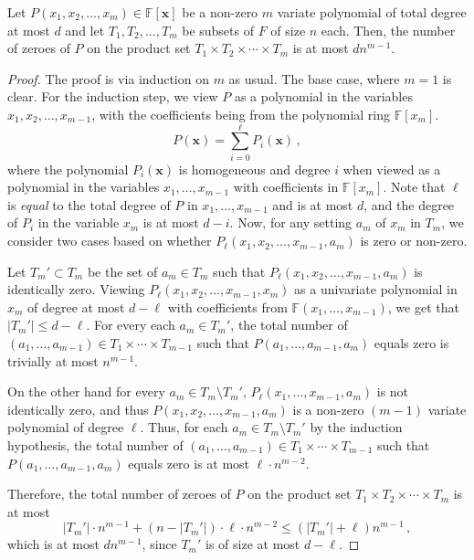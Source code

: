 \documentclass{article}
\def\Field{\mathbb{F}}
\let\F\Field
\def\vecx{\mathbf{x}}
\newcommand{\vx}{\vecx}
\begin{document}
	\begin{lemma}\label{lem: SZ alternate}
		Let $P(x_1, x_2, \ldots, x_m) \in \F[\vx]$ be a non-zero $m$ variate polynomial of total degree at most $d$ and let $T_1, T_2, \ldots, T_m$ be subsets of $F$ of size $n$ each. Then, the number of zeroes of $P$ on the product set $T_1 \times T_2 \times \cdots \times T_m$ is at most $dn^{m-1}$.  
	\end{lemma}
	\begin{proof}
		The proof is via induction on $m$ as usual. The base case, where $m = 1$ is clear. For the induction step, we view $P$ as a polynomial in the variables $x_1, x_2, \ldots, x_{m-1}$, with the coefficients being from the polynomial ring $\F[x_m]$. 
		\[
		P(\vx) = \sum_{i = 0}^{\ell} P_i(\vx) \, , 
		\]
		where the polynomial $P_i(\vx)$ is homogeneous and degree $i$ when viewed as a polynomial in the variables $x_1, \ldots, x_{m-1}$ with coefficients in $\F[x_m]$. Note that $\ell$ is \emph{equal} to the total degree of $P$ in $x_1, \ldots, x_{m-1}$ and is at most $d$, and the degree of $P_i$ in the variable $x_m$ is at most $d-i$. Now, for any setting $a_m$ of $x_m$ in $T_m$,  we consider two cases based on whether $P_{\ell}(x_1, x_2, \ldots, x_{m-1}, a_m)$ is zero or non-zero.  
		
		Let $T_m' \subset T_m$ be the set of $a_m \in T_m$ such that $P_{\ell}(x_1, x_2, \ldots, x_{m-1}, a_m)$ is identically zero. Viewing $P_{\ell}(x_1, x_2, \ldots, x_{m-1}, x_m)$ as a univariate polynomial in $x_m$ of degree at most $d-\ell$ with coefficients from $\F(x_1,\dots,x_{m-1})$, we get that $|T_m'| \leq d-\ell$. For every  each $a_m \in T_m'$, the total number of $(a_1, \ldots, a_{m-1}) \in T_1 \times \cdots \times T_{m-1}$ such that $P(a_1, \ldots, a_{m-1}, a_m)$ equals zero is trivially at most $n^{m-1}$. 
		
		On the other hand for every $a_m \in T_m \setminus T_m'$, $P_{\ell}(x_1, \ldots, x_{m-1}, a_m)$ is not identically zero, and thus $P(x_1, x_2, \ldots, x_{m-1}, a_m)$ is a non-zero $(m-1)$ variate polynomial of degree $\ell$. Thus, for each $a_m \in T_m \setminus T_{m}'$ by the induction hypothesis, the total number of $(a_1, \ldots, a_{m-1}) \in T_1 \times \cdots \times T_{m-1}$ such that $P(a_1, \ldots, a_{m-1}, a_m)$ equals zero is at most $\ell \cdot n^{m-2}$. 
		
		Therefore, the total number of zeroes of $P$ on the product set $T_1 \times T_2 \times \cdots \times T_m$ is at most 
		\[
		|T_m'|\cdot n^{m-1} + (n-|T_m'|)\cdot \ell \cdot n^{m-2} \leq (|T_m'| + \ell )n^{m-1} \, ,
		\]
		which is at most $dn^{m-1}$, since $T_m'$ is of size at most $d-\ell$. 
	\end{proof}
	
\end{document}
